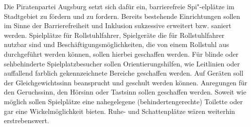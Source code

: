   Die Piratenpartei Augsburg setzt sich dafür ein, barrierefreie Spi"-elplätze 
  im Stadtgebiet zu fördern und zu fordern. Bereits bestehende Einrichtungen 
  sollen im Sinne der Barrierefreiheit und Inklusion sukzessive erweitert bzw. 
  saniert werden. Spielplätze für Rollstuhlfahrer, Spielgeräte die für 
  Rollstuhlfahrer nutzbar sind und Beschäftigungsmöglichkeiten, die von einem 
  Rollstuhl aus durchgeführt werden können, sollen hierbei geschaffen werden. 
  Für blinde oder sehbehinderte Spielplatzbesucher sollen Orientierungshilfen, 
  wie Leitlinien oder auffallend farblich gekennzeichnete Bereiche geschaffen 
  werden. Auf Geräten soll der Gleichgewichtssinn beansprucht und geschult 
  werden können. Anregungen für den Geruchssinn, den Hörsinn oder Tastsinn 
  sollen geschaffen werden. Soweit wie möglich sollen Spielplätze eine 
  nahegelegene (behindertengerechte) Toilette oder gar eine Wickelmöglichkeit 
  bieten. Ruhe- und Schattenplätze wären weiterhin erstrebenswert.
